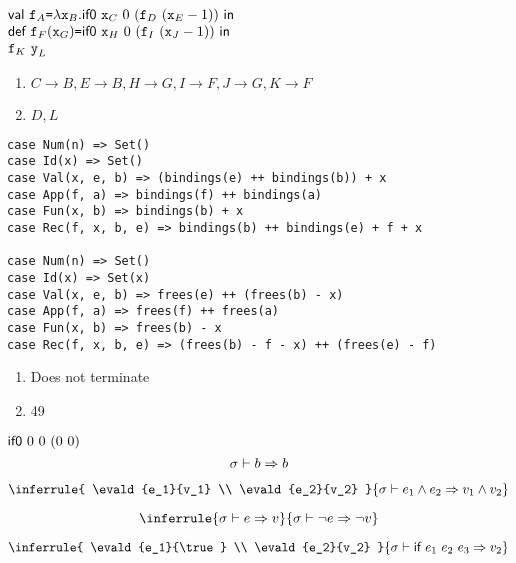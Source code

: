 \textbf{}

$
\begin{array}{@{}l@{}}
  \ebind{\cf_A}{\efun{\cx_B}{\eifz{\cx_C}{0}{(\eapp{\cf_D}{(\esub{\cx_E}{1})})}}}{ \\
  \erec{\cf_F}{\cx_G}{\eifz{\cx_H}{0}{(\eapp{\cf_I}{(\esub{\cx_J}{1})})}}{ \\
  \eapp{\cf_K}{\cy_L}
  }
  }
\end{array}
$
\begin{enumerate}
  \item $C\rightarrow B,E\rightarrow B,H\rightarrow G,I\rightarrow
    F,J\rightarrow G,K\rightarrow F$
  \item $D,L$
\end{enumerate}

\textbf{}
\vspace{-1em}
\begin{verbatim}
case Num(n) => Set()
case Id(x) => Set()
case Val(x, e, b) => (bindings(e) ++ bindings(b)) + x
case App(f, a) => bindings(f) ++ bindings(a)
case Fun(x, b) => bindings(b) + x
case Rec(f, x, b, e) => bindings(b) ++ bindings(e) + f + x

case Num(n) => Set()
case Id(x) => Set(x)
case Val(x, e, b) => frees(e) ++ (frees(b) - x)
case App(f, a) => frees(f) ++ frees(a)
case Fun(x, b) => frees(b) - x
case Rec(f, x, b, e) => (frees(b) - f - x) ++ (frees(e) - f)
\end{verbatim}

\textbf{}
\begin{enumerate}
    \item Does not terminate
    \item 49
\end{enumerate}

\textbf{}

$\textsf{if0}\ 0\ 0\ (0\ 0)$
\\

\textbf{}
\[ \sigma\vdash b\Rightarrow b \]

\[
  \inferrule
  { \evald{e_1}{v_1} \\ \evald{e_2}{v_2} }
  { \evald{e_1\wedge e_2}{v_1\wedge v_2} }
\]

\[
  \inferrule
  { \evald{e}{v} }
  { \evald{\neg e}{\neg v} }
\]

\[
  \inferrule
  { \evald{e_1}{\true} \\ \evald{e_2}{v_2} }
  { \evald{\eif{e_1}{e_2}{e_3}}{v_2} }
\]

